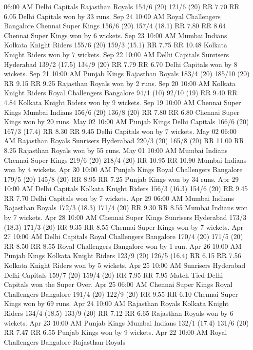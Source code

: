 06:00 AM
Delhi Capitals
Rajasthan Royals
154/6 (20)
121/6 (20)
RR 7.70
RR 6.05
Delhi Capitals won by 33 runs.
Sep 24
10:00 AM
Royal Challengers Bangalore
Chennai Super Kings
156/6 (20)
157/4 (18.1)
RR 7.80
RR 8.64
Chennai Super Kings won by 6 wickets.
Sep 23
10:00 AM
Mumbai Indians
Kolkata Knight Riders
155/6 (20)
159/3 (15.1)
RR 7.75
RR 10.48
Kolkata Knight Riders won by 7 wickets.
Sep 22
10:00 AM
Delhi Capitals
Sunrisers Hyderabad
139/2 (17.5)
134/9 (20)
RR 7.79
RR 6.70
Delhi Capitals won by 8 wickets.
Sep 21
10:00 AM
Punjab Kings
Rajasthan Royals
183/4 (20)
185/10 (20)
RR 9.15
RR 9.25
Rajasthan Royals won by 2 runs.
Sep 20
10:00 AM
Kolkata Knight Riders
Royal Challengers Bangalore
94/1 (10)
92/10 (19)
RR 9.40
RR 4.84
Kolkata Knight Riders won by 9 wickets.
Sep 19
10:00 AM
Chennai Super Kings
Mumbai Indians
156/6 (20)
136/8 (20)
RR 7.80
RR 6.80
Chennai Super Kings won by 20 runs.
May 02
10:00 AM
Punjab Kings
Delhi Capitals
166/6 (20)
167/3 (17.4)
RR 8.30
RR 9.45
Delhi Capitals won by 7 wickets.
May 02
06:00 AM
Rajasthan Royals
Sunrisers Hyderabad
220/3 (20)
165/8 (20)
RR 11.00
RR 8.25
Rajasthan Royals won by 55 runs.
May 01
10:00 AM
Mumbai Indians
Chennai Super Kings
219/6 (20)
218/4 (20)
RR 10.95
RR 10.90
Mumbai Indians won by 4 wickets.
Apr 30
10:00 AM
Punjab Kings
Royal Challengers Bangalore
179/5 (20)
145/8 (20)
RR 8.95
RR 7.25
Punjab Kings won by 34 runs.
Apr 29
10:00 AM
Delhi Capitals
Kolkata Knight Riders
156/3 (16.3)
154/6 (20)
RR 9.45
RR 7.70
Delhi Capitals won by 7 wickets.
Apr 29
06:00 AM
Mumbai Indians
Rajasthan Royals
172/3 (18.3)
171/4 (20)
RR 9.30
RR 8.55
Mumbai Indians won by 7 wickets.
Apr 28
10:00 AM
Chennai Super Kings
Sunrisers Hyderabad
173/3 (18.3)
171/3 (20)
RR 9.35
RR 8.55
Chennai Super Kings won by 7 wickets.
Apr 27
10:00 AM
Delhi Capitals
Royal Challengers Bangalore
170/4 (20)
171/5 (20)
RR 8.50
RR 8.55
Royal Challengers Bangalore won by 1 run.
Apr 26
10:00 AM
Punjab Kings
Kolkata Knight Riders
123/9 (20)
126/5 (16.4)
RR 6.15
RR 7.56
Kolkata Knight Riders won by 5 wickets.
Apr 25
10:00 AM
Sunrisers Hyderabad
Delhi Capitals
159/7 (20)
159/4 (20)
RR 7.95
RR 7.95
Match Tied Delhi Capitals won the Super Over.
Apr 25
06:00 AM
Chennai Super Kings
Royal Challengers Bangalore
191/4 (20)
122/9 (20)
RR 9.55
RR 6.10
Chennai Super Kings won by 69 runs.
Apr 24
10:00 AM
Rajasthan Royals
Kolkata Knight Riders
134/4 (18.5)
133/9 (20)
RR 7.12
RR 6.65
Rajasthan Royals won by 6 wickets.
Apr 23
10:00 AM
Punjab Kings
Mumbai Indians
132/1 (17.4)
131/6 (20)
RR 7.47
RR 6.55
Punjab Kings won by 9 wickets.
Apr 22
10:00 AM
Royal Challengers Bangalore
Rajasthan Royals

